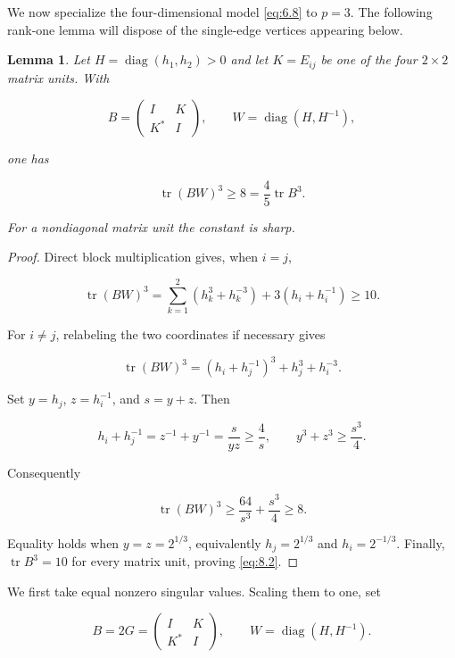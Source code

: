 \documentclass[11pt]{article}
\newtheorem{lemma}[theorem]{Lemma}
\begin{document}
We now specialize the four-dimensional model \eqref{eq:6.8} to $p=3$. The following
rank-one lemma will dispose of the single-edge vertices appearing below.

\begin{lemma}
\label{lem:cubic-single-edge}
Let $H=\operatorname{diag}(h_1,h_2)>0$ and let
$K=E_{ij}$ be one of the four $2\times2$ matrix units. With

\[
B=\begin{pmatrix}I&K\\K^*&I\end{pmatrix},
\qquad W=\operatorname{diag}(H,H^{-1}),
\tag{8.1}\label{eq:8.1}
\]

one has

\[
\operatorname{tr}(BW)^3\ge8
=\frac45\operatorname{tr}B^3.
\tag{8.2}\label{eq:8.2}
\]

For a nondiagonal matrix unit the constant is sharp.

\end{lemma}

\begin{proof}
Direct block multiplication gives, when $i=j$,

\[
\operatorname{tr}(BW)^3
=\sum_{k=1}^2(h_k^3+h_k^{-3})+3(h_i+h_i^{-1})\ge10.
\tag{8.3}\label{eq:8.3}
\]

For $i\ne j$, relabeling the two coordinates if necessary gives

\[
\operatorname{tr}(BW)^3
=(h_i+h_j^{-1})^3+h_j^3+h_i^{-3}.
\tag{8.4}\label{eq:8.4}
\]

Set $y=h_j$, $z=h_i^{-1}$, and $s=y+z$. Then

\[
h_i+h_j^{-1}=z^{-1}+y^{-1}=\frac{s}{yz}\ge\frac4s,
\qquad y^3+z^3\ge\frac{s^3}{4}.
\tag{8.5}\label{eq:8.5}
\]

Consequently

\[
\operatorname{tr}(BW)^3
\ge\frac{64}{s^3}+\frac{s^3}{4}\ge8.
\tag{8.6}\label{eq:8.6}
\]

Equality holds when $y=z=2^{1/3}$, equivalently
$h_j=2^{1/3}$ and $h_i=2^{-1/3}$. Finally,
$\operatorname{tr}B^3=10$ for every matrix unit, proving \eqref{eq:8.2}.
\end{proof}


We first take equal nonzero singular values. Scaling them to one, set

\[
B=2G=\begin{pmatrix}I&K\\K^*&I\end{pmatrix},
\qquad W=\operatorname{diag}(H,H^{-1}).
\tag{8.7}\label{eq:8.7}
\]
\end{document}
